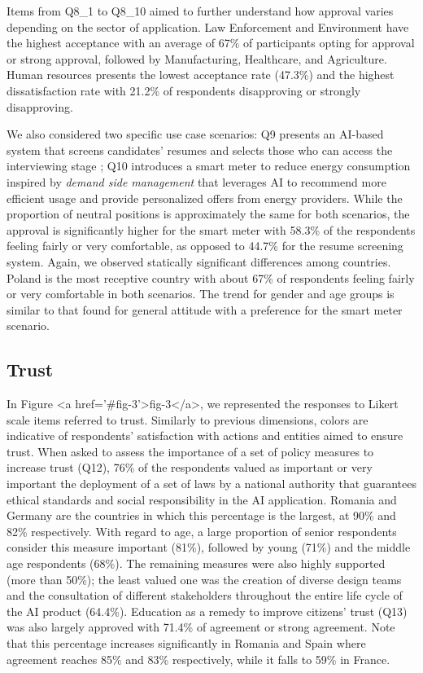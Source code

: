\documentclass{article}
\begin{document}
Items from Q8\_1 to Q8\_10 aimed to further understand how approval varies depending on the sector of application.
Law Enforcement and Environment have the highest acceptance with an average of 67\% of participants opting for approval or strong approval, followed by Manufacturing, Healthcare, and Agriculture. Human resources presents the lowest acceptance rate (47.3\%) and the highest dissatisfaction rate with 21.2\% of respondents disapproving or strongly disapproving. 

We also considered two specific use case scenarios: Q9 presents an AI-based system that screens candidates' resumes and selects those who can access the interviewing stage \cite{bogen2018help}; Q10 introduces a smart meter to reduce energy consumption inspired by \emph{demand side management} \cite{khan2019smart} that leverages AI to recommend more efficient usage and provide personalized offers from energy providers. 
While the proportion of neutral positions is approximately the same for both scenarios, the approval is significantly higher for the smart meter with 58.3\% of the respondents feeling fairly or very comfortable, as opposed to 44.7\% for the resume screening system. Again, we observed statically significant differences among countries. Poland is the most receptive country with about 67\% of respondents feeling fairly or very comfortable in both scenarios. The trend for gender and age groups is similar to that found for general attitude with a preference for the smart meter scenario.

\subsection{Trust}

In Figure <a href='#fig-3'>fig-3</a>, we represented the responses to Likert scale items referred to trust. Similarly to previous dimensions, colors are indicative of respondents' satisfaction with actions and entities aimed to ensure trust.
When asked to assess the importance of a set of policy measures to increase trust (Q12), 76\% of the respondents valued as important or very important the deployment of a set of laws by a national authority that guarantees ethical standards and social responsibility in the AI application. Romania and Germany are the countries in which this percentage is the largest, at 90\% and 82\% respectively. With regard to age, a large proportion of senior respondents consider this measure important (81\%), followed by young (71\%) and the middle age respondents (68\%).
The remaining measures were also highly supported (more than 50\%); the least valued one was the creation of diverse design teams and the consultation of different stakeholders throughout the entire life cycle of the AI product (64.4\%). Education as a remedy to improve citizens' trust (Q13) was also largely approved with 71.4\% of agreement or strong agreement. Note that this percentage increases significantly in Romania and Spain where agreement reaches 85\% and 83\% respectively, while it falls to 59\% in France. 
\end{document}
